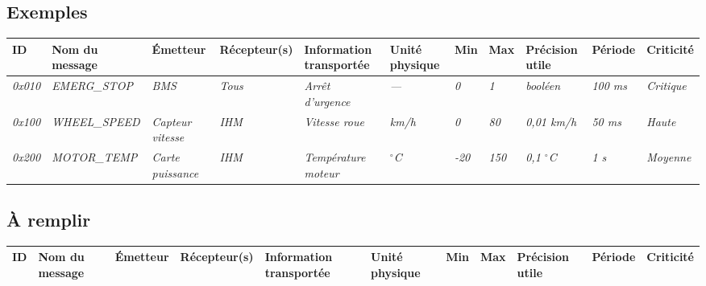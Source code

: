 \documentclass[10pt,a4paper]{article}
\newcommand{\ex}[1]{\textcolor{exgrey}{\textit{#1}}}
\let\oldsubsection\subsection
\renewcommand{\subsection}{\Needspace*{8\baselineskip}\oldsubsection}
\begin{document}
\begin{Form}
\subsection*{Exemples}
\begin{longtable}{C{1.3cm} L{2.9cm} L{2.3cm} L{2.3cm} L{3.4cm} L{1.7cm} C{1.3cm} C{1.3cm} L{1.9cm} C{1.5cm} L{1.7cm}}
  \toprule
  \textbf{ID} & \textbf{Nom du message} & \textbf{Émetteur} & \textbf{Récepteur(s)} & \textbf{Information transportée} & \textbf{Unité physique} & \textbf{Min} & \textbf{Max} & \textbf{Précision utile} & \textbf{Période} & \textbf{Criticité} \\
  \midrule
  \endhead
  \ex{0x010} & \ex{EMERG\_STOP} & \ex{BMS} & \ex{Tous} & \ex{Arrêt d'urgence} & \ex{---} & \ex{0} & \ex{1} & \ex{booléen} & \ex{100 ms} & \ex{Critique} \\
  \ex{0x100} & \ex{WHEEL\_SPEED} & \ex{Capteur vitesse} & \ex{IHM} & \ex{Vitesse roue} & \ex{km/h} & \ex{0} & \ex{80} & \ex{0,01 km/h} & \ex{50 ms} & \ex{Haute} \\
  \ex{0x200} & \ex{MOTOR\_TEMP} & \ex{Carte puissance} & \ex{IHM} & \ex{Température moteur} & \ex{$^\circ$C} & \ex{-20} & \ex{150} & \ex{0,1 $^\circ$C} & \ex{1 s} & \ex{Moyenne} \\
  \bottomrule
\end{longtable}

\subsection*{À remplir}
\begin{longtable}{C{1.3cm} L{2.9cm} L{2.3cm} L{2.3cm} L{3.4cm} L{1.7cm} C{1.3cm} C{1.3cm} L{1.9cm} C{1.5cm} L{1.7cm}}
  \toprule
  \textbf{ID} & \textbf{Nom du message} & \textbf{Émetteur} & \textbf{Récepteur(s)} & \textbf{Information transportée} & \textbf{Unité physique} & \textbf{Min} & \textbf{Max} & \textbf{Précision utile} & \textbf{Période} & \textbf{Criticité} \\
  \midrule
  \endhead


\end{longtable}
\end{Form}
\end{document}
